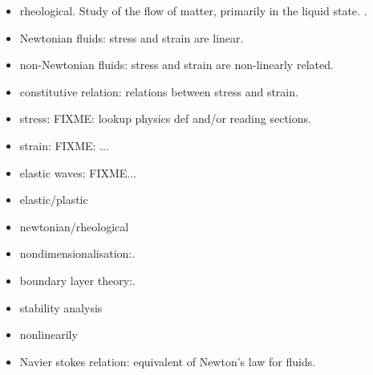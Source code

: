 \begin{itemize}
\item rheological.  Study of the flow of matter, primarily in the liquid state.  \cite{wiki:rheology}.
\item Newtonian fluids: stress and strain are linear.
\item non-Newtonian fluids: stress and strain are non-linearly related.
\item constitutive relation: relations between stress and strain.
\item stress: FIXME: lookup physics def and/or reading sections.
\item strain: FIXME: ...
\item elastic waves: FIXME...
\item elastic/plastic
\item newtonian/rheological
\item nondimensionalisation:.
\item boundary layer theory:.
\item stability analysis
\item nonlinearily 
\item Navier stokes relation: equivalent of Newton's law for fluids.
\end{itemize}

\EndArticle
